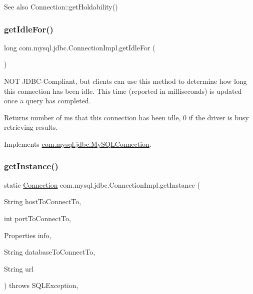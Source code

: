 \begin{DoxySeeAlso}{See also}
Connection\+::get\+Holdability() 
\end{DoxySeeAlso}
\mbox{\label{classcom_1_1mysql_1_1jdbc_1_1_connection_impl_a6d675106c9edd73d2472401cf33b82a8}} 
\subsubsection{\texorpdfstring{get\+Idle\+For()}{getIdleFor()}}
{\footnotesize\ttfamily long com.\+mysql.\+jdbc.\+Connection\+Impl.\+get\+Idle\+For (\begin{DoxyParamCaption}{ }\end{DoxyParamCaption})}

N\+OT J\+D\+B\+C-\/\+Compliant, but clients can use this method to determine how long this connection has been idle. This time (reported in milliseconds) is updated once a query has completed.

\begin{DoxyReturn}{Returns}
number of ms that this connection has been idle, 0 if the driver is busy retrieving results. 
\end{DoxyReturn}


Implements \mbox{\hyperlink{interfacecom_1_1mysql_1_1jdbc_1_1_my_s_q_l_connection_a835df16f7b2e35f0729ba560fd210a2a}{com.\+mysql.\+jdbc.\+My\+S\+Q\+L\+Connection}}.

\mbox{\label{classcom_1_1mysql_1_1jdbc_1_1_connection_impl_afda2c6f126087c49737afee5bc053e32}} 
\subsubsection{\texorpdfstring{get\+Instance()}{getInstance()}}
{\footnotesize\ttfamily static \mbox{\hyperlink{interfacecom_1_1mysql_1_1jdbc_1_1_connection}{Connection}} com.\+mysql.\+jdbc.\+Connection\+Impl.\+get\+Instance (\begin{DoxyParamCaption}\item[{String}]{host\+To\+Connect\+To,  }\item[{int}]{port\+To\+Connect\+To,  }\item[{Properties}]{info,  }\item[{String}]{database\+To\+Connect\+To,  }\item[{String}]{url }\end{DoxyParamCaption}) throws S\+Q\+L\+Exception\hspace{0.3cm}{\ttfamily [static]}, {\ttfamily [protected]}}

